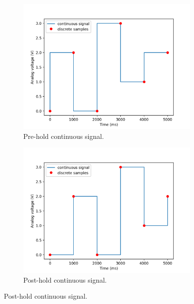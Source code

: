 \documentclass[12pt]{article}
\begin{document}
\begin{figure}
\begin{subfigure}[b]{.45\linewidth}
\includegraphics[width=\linewidth]{input-pre.png}
\caption{Pre-hold continuous signal.}
\end{subfigure}
\begin{subfigure}[b]{.45\linewidth}
\includegraphics[width=\linewidth]{input-post.png}
\caption{Post-hold continuous signal.}
\end{subfigure}


\end{figure}
\end{document}
